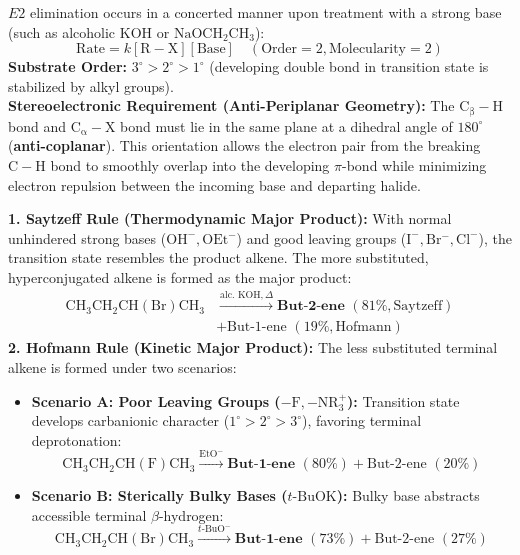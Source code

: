 \documentclass[10pt,twoside,openright]{book}
\begin{document}
\begin{conceptbox}
$E2$ elimination occurs in a concerted manner upon treatment with a strong base (such as alcoholic $\mathrm{KOH}$ or $\mathrm{NaOCH_2CH_3}$):
\begin{equation}
  \text{Rate} = k[\mathrm{R-X}][\text{Base}] \quad (\text{Order} = 2, \text{Molecularity} = 2)
\end{equation}
\textbf{Substrate Order:} $3^\circ > 2^\circ > 1^\circ$ (developing double bond in transition state is stabilized by alkyl groups).\\[4pt]
\textbf{Stereoelectronic Requirement (Anti-Periplanar Geometry):}
The $\mathrm{C_\beta-H}$ bond and $\mathrm{C_\alpha-X}$ bond must lie in the same plane at a dihedral angle of $180^\circ$ (\textbf{anti-coplanar}). This orientation allows the electron pair from the breaking $\mathrm{C-H}$ bond to smoothly overlap into the developing $\pi$-bond while minimizing electron repulsion between the incoming base and departing halide.
\end{conceptbox}

\begin{formulabox}
\textbf{1. Saytzeff Rule (Thermodynamic Major Product):}
With normal unhindered strong bases ($\mathrm{OH^-, OEt^-}$) and good leaving groups ($\mathrm{I^-, Br^-, Cl^-}$), the transition state resembles the product alkene. The more substituted, hyperconjugated alkene is formed as the major product:
\begin{align*}
  \mathrm{CH_3CH_2CH(Br)CH_3} &\xrightarrow{\text{alc. } \mathrm{KOH}, \Delta} \textbf{But-2-ene } (81\%, \text{Saytzeff}) \\
  &+ \text{But-1-ene } (19\%, \text{Hofmann})
\end{align*}
\textbf{2. Hofmann Rule (Kinetic Major Product):}
The less substituted terminal alkene is formed under two scenarios:
\begin{itemize}[leftmargin=*]
  \item \textbf{Scenario A: Poor Leaving Groups ($-\mathrm{F, -NR_3^+}$):}
  Transition state develops carbanionic character ($1^\circ > 2^\circ > 3^\circ$), favoring terminal deprotonation:
  \begin{equation*}
    \mathrm{CH_3CH_2CH(F)CH_3} \xrightarrow{\mathrm{EtO^-}} \textbf{But-1-ene } (80\%) + \text{But-2-ene } (20\%)
  \end{equation*}
  \item \textbf{Scenario B: Sterically Bulky Bases ($t\text{-BuOK}$):}
  Bulky base abstracts accessible terminal $\beta$-hydrogen:
  \begin{equation*}
    \mathrm{CH_3CH_2CH(Br)CH_3} \xrightarrow{t\text{-BuO}^-} \textbf{But-1-ene } (73\%) + \text{But-2-ene } (27\%)
  \end{equation*}
\end{itemize}
\end{formulabox}
\end{document}
